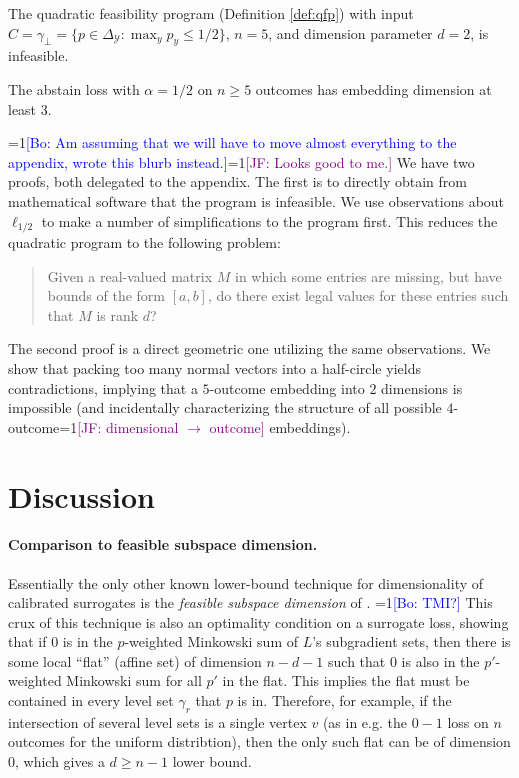 \documentclass[anon]{colt2020} %
\newcommand{\Comments}{1}
\newcommand{\mynote}[2]{\ifnum\Comments=1\textcolor{#1}{#2}\fi}
\newcommand{\jessie}[1]{\mynote{purple}{[JF: #1]}}
\newcommand{\bo}[1]{\mynote{blue}{[Bo: #1]}}
\newcommand{\simplex}{\Delta_\Y}
\newcommand{\Y}{\mathcal{Y}}
\begin{document}
\begin{proposition}\label{prop:qfp-fails-abstain}
  The quadratic feasibility program (Definition \ref{def:qfp}) with input $C = \gamma_{\bot} = \{p \in \simplex: \max_y p_y \leq 1/2\}$, $n=5$, and dimension parameter $d=2$, is infeasible.
\end{proposition}
\begin{corollary}
  The abstain loss with $\alpha=1/2$ on $n\geq 5$ outcomes has embedding dimension at least $3$.
\end{corollary}

\bo{Am assuming that we will have to move almost everything to the appendix, wrote this blurb instead.}\jessie{Looks good to me.}
We have two proofs, both delegated to the appendix.
The first is to directly obtain from mathematical software that the program is infeasible.
We use observations about $\ell_{1/2}$ to make a number of simplifications to the program first.
This reduces the quadratic program to the following problem: 
\begin{quotation}
  Given a real-valued matrix $M$ in which some entries are missing, but have bounds of the form $[a,b]$, do there exist legal values for these entries such that $M$ is rank $d$?
\end{quotation}
The second proof is a direct geometric one utilizing the same observations.
We show that packing too many normal vectors into a half-circle yields contradictions, implying that a $5$-outcome embedding into $2$ dimensions is impossible (and incidentally characterizing the structure of all possible $4$-outcome\jessie{dimensional $\to$ outcome} embeddings).


\section{Discussion} \label{sec:conclusion}
\paragraph{Comparison to feasible subspace dimension.}
Essentially the only other known lower-bound technique for dimensionality of calibrated surrogates is the \emph{feasible subspace dimension} of \cite{ramaswamy2016convex}.
\bo{TMI?}
This crux of this technique is also an optimality condition on a surrogate loss, showing that if $0$ is in the $p$-weighted Minkowski sum of $L$'s subgradient sets, then there is some local ``flat'' (affine set) of dimension $n-d-1$ such that $0$ is also in the $p'$-weighted Minkowski sum for all $p'$ in the flat.
This implies the flat must be contained in every level set $\gamma_r$ that $p$ is in.
Therefore, for example, if the intersection of several level sets is a single vertex $v$ (as in e.g. the $0-1$ loss on $n$ outcomes for the uniform distribtion), then the only such flat can be of dimension $0$, which gives a $d \geq n-1$ lower bound.
\end{document}
